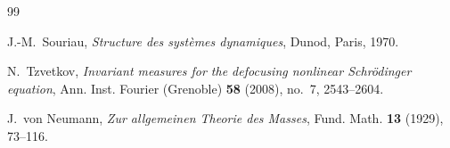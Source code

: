 \documentclass[11pt,reqno]{amsart}
\begin{document}
\begin{thebibliography}{99}

J.-M.~Souriau,
\emph{Structure des systèmes dynamiques},
Dunod, Paris, 1970.


N.~Tzvetkov,
\emph{Invariant measures for the defocusing nonlinear Schrödinger equation},
Ann. Inst. Fourier (Grenoble) \textbf{58} (2008), no.~7, 2543--2604.


J.~von Neumann,
\emph{Zur allgemeinen Theorie des Masses},
Fund. Math. \textbf{13} (1929), 73--116.


\end{thebibliography}
\end{document}
